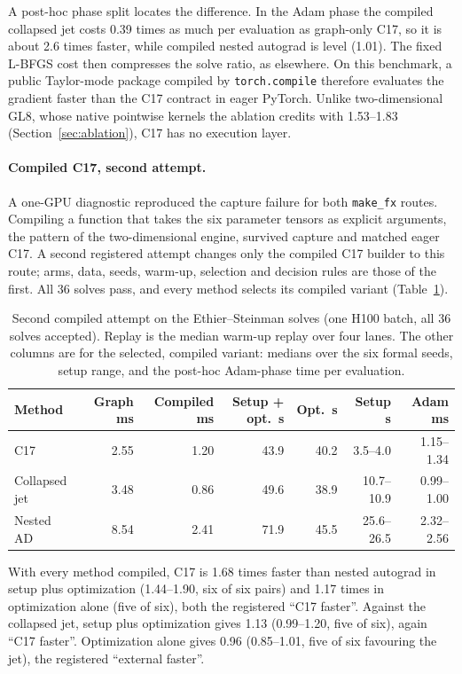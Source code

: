 \documentclass[11pt]{article}
\begin{document}
A post-hoc phase split locates the difference. In the Adam phase the
compiled collapsed jet costs 0.39 times as much per evaluation as
graph-only C17, so it is about 2.6 times faster, while compiled nested
autograd is level (1.01). The fixed L-BFGS cost then compresses the solve
ratio, as elsewhere. On this benchmark, a public Taylor-mode package
compiled by \texttt{torch.compile} therefore evaluates the gradient faster
than the C17 contract in eager PyTorch. Unlike two-dimensional GL8, whose
native pointwise kernels the ablation credits with 1.53--1.83
(Section~\ref{sec:ablation}), C17 has no execution layer.

\paragraph{Compiled C17, second attempt.}
A one-GPU diagnostic reproduced the capture failure for both
\texttt{make\_fx} routes. Compiling a function that takes the six
parameter tensors as explicit arguments, the pattern of the
two-dimensional engine, survived capture and matched eager C17. A second
registered attempt changes only the compiled C17 builder to this route;
arms, data, seeds, warm-up, selection and decision rules are those of the
first. All 36 solves pass, and every method selects its compiled variant
(Table~\ref{tab:ethierext3}).

\begin{table}[htbp]\centering\small
\setlength{\tabcolsep}{4pt}
\caption{Second compiled attempt on the Ethier--Steinman solves (one H100 batch, all 36 solves accepted). Replay is the median warm-up replay over four lanes. The other columns are for the selected, compiled variant: medians over the six formal seeds, setup range, and the post-hoc Adam-phase time per evaluation.}
\label{tab:ethierext3}
\begin{tabular}{lrrrrrr}\toprule
Method & Graph ms & Compiled ms & Setup + opt.\ s & Opt.\ s & Setup s & Adam ms\\\midrule
C17 & 2.55 & 1.20 & 43.9 & 40.2 & 3.5--4.0 & 1.15--1.34\\
Collapsed jet & 3.48 & 0.86 & 49.6 & 38.9 & 10.7--10.9 & 0.99--1.00\\
Nested AD & 8.54 & 2.41 & 71.9 & 45.5 & 25.6--26.5 & 2.32--2.56\\
\bottomrule\end{tabular}
\end{table}

With every method compiled, C17 is 1.68 times faster than nested autograd
in setup plus optimization (1.44--1.90, six of six pairs) and 1.17 times in
optimization alone (five of six), both the registered ``C17 faster''.
Against the collapsed jet, setup plus optimization gives 1.13 (0.99--1.20,
five of six), again ``C17 faster''. Optimization alone gives 0.96
(0.85--1.01, five of six favouring the jet), the registered ``external
faster''.
\end{document}
